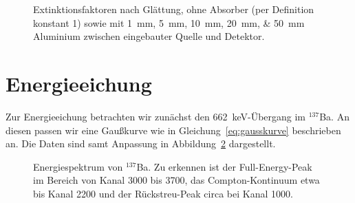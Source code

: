 \documentclass[11pt, ngerman, fleqn, DIV=15, headinclude, BCOR=2cm]{scrreprt}
\begin{document}
\begin{figure}[htbp]
    \centering
    \caption{%
        Extinktionsfaktoren nach Glättung, ohne Absorber (per Definition
        konstant 1) sowie mit \SIlist{1;5;10;20;50}{\milli\meter} Aluminium
        zwischen eingebauter Quelle und Detektor.
    }
    \label{fig:extinktion}
\end{figure}

\section{Energieeichung}

Zur Energieeichung betrachten wir zunächst den
\SI{662}{\kilo\electronvolt}-Übergang im ${}^{137}$Ba. An diesen passen wir
eine Gaußkurve wie in Gleichung~\eqref{eq:gausskurve} beschrieben an. Die Daten
sind samt Anpassung in Abbildung~\ref{fig:eichung_137Ba} dargestellt.

\begin{figure}[htbp]
    \centering
    \caption{%
        Energiespektrum von ${}^{137}$Ba. Zu erkennen ist der Full-Energy-Peak
        im Bereich von Kanal 3000 bis 3700, das Compton-Kontinuum etwa bis
        Kanal 2200 und der Rückstreu-Peak circa bei Kanal 1000.
    }
    \label{fig:eichung_137Ba}
\end{figure}
 
\end{document}

